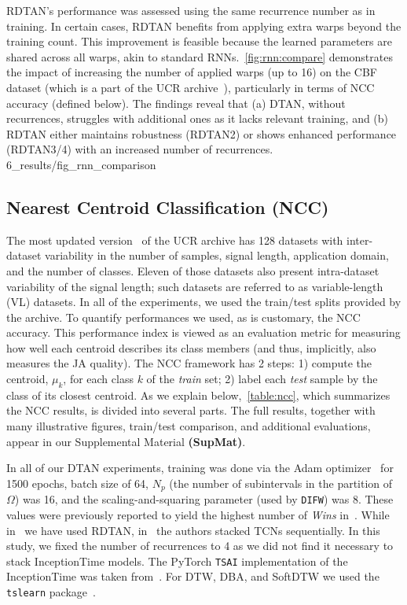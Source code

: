 RDTAN's performance was assessed using the same recurrence number as in training. In certain cases, RDTAN benefits from applying extra warps beyond the training count. This improvement is feasible because the learned parameters are shared across all warps, akin to standard RNNs.~\autoref{fig:rnn:compare} demonstrates the impact of increasing the number of applied warps (up to 16) on the CBF dataset (which is a part of the UCR archive~\cite{Dau:2019:ucr}), particularly in terms of NCC accuracy (defined below). The findings reveal that (a) DTAN, without recurrences, struggles with additional ones as it lacks relevant training, and (b) RDTAN either maintains robustness (RDTAN2) or shows enhanced performance (RDTAN3/4) with an increased number of recurrences.
{6_results/fig_rnn_comparison}

%
%
%
\subsection{Nearest Centroid Classification (NCC)}\label{Sec:Results:sub:NCC}
The most updated version~\cite{Dau:2019:ucr} of the UCR archive has 128  datasets with inter-dataset variability in the number of samples, signal length, application domain, and the number of classes. Eleven of those datasets also present intra-dataset variability of the signal length; such datasets are referred to as variable-length (VL) datasets.
In all of the experiments, we used the train/test splits provided by the archive. 
To quantify performances we used, as is customary, 
the NCC accuracy. This performance index is viewed as an evaluation metric for measuring how well each centroid describes its class members (and thus, implicitly, also measures the JA quality). 
The NCC framework has 2 steps: 1) compute the centroid, $\mu_k$, for each class $k$ of the \emph{train} set; 2) label each \emph{test} sample by the class of its closest centroid. As we explain below,~\autoref{table:ncc}, which summarizes the NCC results, is divided into several parts. The full results, together with many illustrative figures, train/test comparison, and additional evaluations, appear in our Supplemental Material \textbf{(SupMat)}.

In all of our DTAN experiments, training was done via the Adam optimizer~\cite{Kingma:arxiv:2014:Adam} for 1500 epochs, batch size of 64, $N_p$ (the number of subintervals in the partition of $\Omega$) was 16, and the scaling-and-squaring parameter (used by \texttt{DIFW}) was 8. These values were previously reported to yield the highest number of \emph{Wins} in~\cite{Martinez:ICML:2022:closed}. 
While in~\cite{Shapira:NIPS:2019:DTAN} we have used RDTAN, in~\citet{Martinez:ICML:2022:closed} the authors stacked TCNs sequentially. In this study, we fixed the number of recurrences to 4 as we did not find it necessary to stack InceptionTime models.
The PyTorch \texttt{TSAI} implementation of the InceptionTime was taken from~\cite{Ignacio:tsai}.
For DTW, DBA, and SoftDTW we used the \texttt{tslearn} package~\cite{tavenard:2017:tslearn}. 
